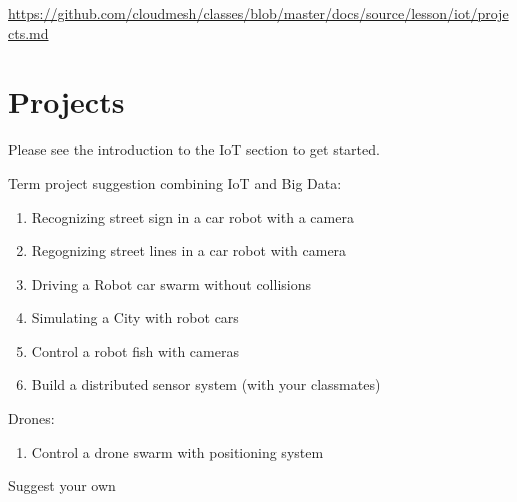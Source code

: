 \begin{fileremark}\url{https://github.com/cloudmesh/classes/blob/master/docs/source/lesson/iot/projects.md}\end{fileremark}
\section{Projects}\label{projects}

Please see the introduction to the IoT section to get started.

Term project suggestion combining IoT and Big Data:

\begin{enumerate}
\def\labelenumi{\arabic{enumi}.}
\tightlist
\item
  Recognizing street sign in a car robot with a camera
\item
  Regognizing street lines in a car robot with camera
\item
  Driving a Robot car swarm without collisions
\item
  Simulating a City with robot cars
\item
  Control a robot fish with cameras
\item
  Build a distributed sensor system (with your classmates)
\end{enumerate}

Drones:

\begin{enumerate}
\def\labelenumi{\arabic{enumi}.}
\tightlist
\item
  Control a drone swarm with positioning system
\end{enumerate}

Suggest your own
